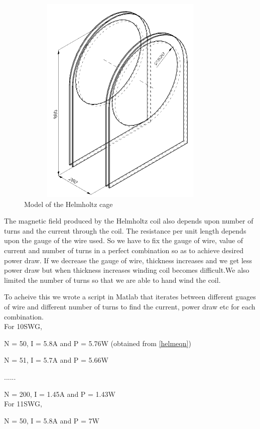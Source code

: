 \begin{figure}[h!]
	\centering
	\includegraphics[width=4in,height=4in]{./images/assem.png}
	\caption{Model of the Helmholtz cage}
	\label{fig-hlmhtz-cad}
\end{figure}

The magnetic field produced by the Helmholtz coil also depends upon number of turns and the current through the coil. The resistance per unit length depends upon the gauge of the wire used. So we have to fix the gauge of wire, value of current and number of turns in a perfect combination so as to achieve desired power draw. If we decrease the gauge of wire, thickness increases and we get less power draw but when thickness increases winding coil becomes difficult.We also limited the number of turns so that we are able to hand wind the coil. 

To acheive this we wrote a script in Matlab that iterates between different guages of wire and different number of turns to find the current, power draw etc for each combination.\\

\noindent For 10SWG,

\noindent N = 50, I = 5.8A and P = 5.76W (obtained from \ref{helmeqn})

\noindent N = 51, I = 5.7A and P = 5.66W

\noindent ......

\noindent N = 200, I = 1.45A and P = 1.43W\\

\noindent For 11SWG,

\noindent N = 50, I = 5.8A and P = 7W

